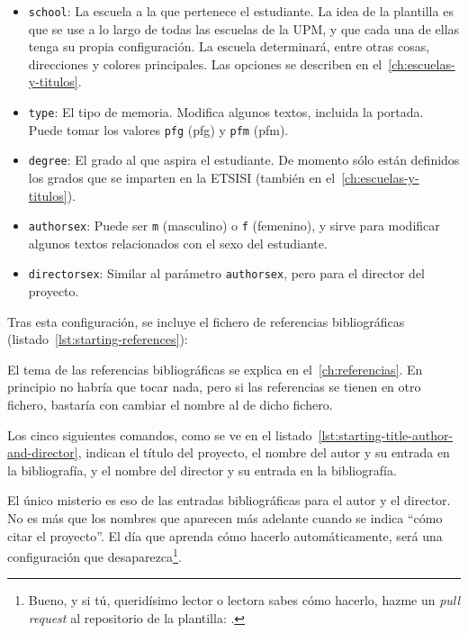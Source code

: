 \begin{itemize}
    \item \texttt{school}: La escuela a la que pertenece el estudiante. La idea de la plantilla es que se use a lo largo de todas las escuelas de la UPM, y que cada una de ellas tenga su propia configuración. La escuela determinará, entre otras cosas, direcciones y colores principales. Las opciones se describen en el~\autoref{ch:escuelas-y-titulos}.
    \item \texttt{type}: El tipo de memoria. Modifica algunos textos, incluida la portada. Puede tomar los valores \texttt{pfg} (\acrlong{pfg}) y \texttt{pfm}  (\acrlong{pfm}).
    \item \texttt{degree}: El grado al que aspira el estudiante. De momento sólo están definidos los grados que se imparten en la ETSISI (también en el~\autoref{ch:escuelas-y-titulos}).
    \item \texttt{authorsex}: Puede ser \texttt{m} (masculino) o \texttt{f} (femenino), y sirve para modificar algunos textos relacionados con el sexo del estudiante.
    \item \texttt{directorsex}: Similar al parámetro \texttt{authorsex}, pero para el director del proyecto.
\end{itemize}

Tras esta configuración, se incluye el fichero de referencias bibliográficas (listado~\ref{lst:starting-references}):



El tema de las referencias bibliográficas se explica en el~\autoref{ch:referencias}. En principio no habría que tocar nada, pero si las referencias se tienen en otro fichero, bastaría con cambiar el nombre al de dicho fichero.

Los cinco siguientes comandos, como se ve en el listado~\ref{lst:starting-title-author-and-director}, indican el título del proyecto, el nombre del autor y su entrada en la bibliografía, y el nombre del director y su entrada en la bibliografía.



El único misterio es eso de las entradas bibliográficas para el autor y el director. No es más que los nombres que aparecen más adelante cuando se indica \enquote{cómo citar el proyecto}. El día que aprenda cómo hacerlo automáticamente, será una configuración que desaparezca\footnote{Bueno, y si tú, queridísimo lector o lectora sabes cómo hacerlo, hazme un \textit{pull request} al repositorio de la plantilla: \href{\templaterepository}{\templaterepository}.}.

